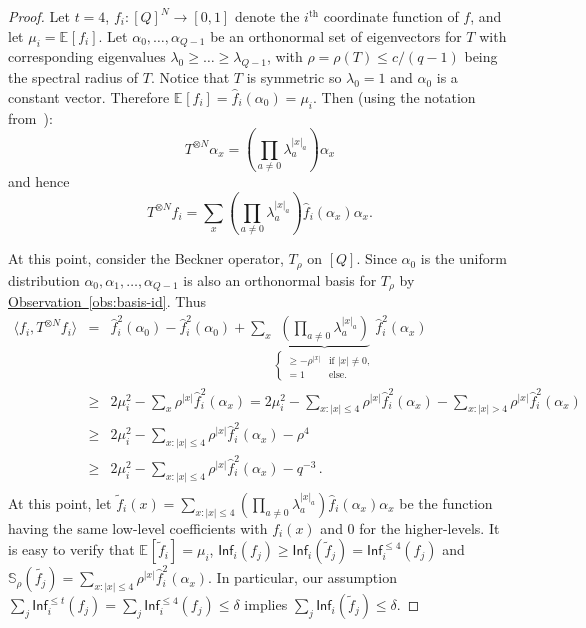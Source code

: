 \documentclass[10pt]{article}
\theoremstyle{definition}
\numberwithin{equation}{section}
\newcommand{\expref}[2]{\texorpdfstring{\hyperref[#2]{#1~\ref{#2}}}{#1~\ref{#2}}}
\newcommand{\expct}[2]{\mathbb{E}_{#1}\left[#2\right]}
\newcommand{\infl}{\ensuremath{\mathsf{Inf}}}
\newcommand{\texsup}[2]{\ensuremath{\text{#1}^{\text{#2}}}}
\renewcommand{\ge}{\geqslant}
\renewcommand{\le}{\leqslant}
\begin{document}
\begin{proof}
  Let $t=4$, $f_i:[Q]^N\rightarrow[0,1]$ denote the \texsup{$i$}{th}
  coordinate function of $f$, and let $\mu_i = \expct{}{f_i}$. Let
  $\alpha_0,\ldots, \alpha_{Q-1}$ be an orthonormal set of
  eigenvectors for $T$ with corresponding eigenvalues ${\lambda_0\ge
    \ldots\ge \lambda_{Q-1}}$, with $\rho=\rho(T)\le {c}/{(q-1)}$
  being the spectral radius of $T$. Notice that $T$ is symmetric so
  $\lambda_0 = 1$ and $\alpha_0$ is a constant vector. Therefore
  $\expct{}{f_i} = \hat{f}_i(\alpha_0) = \mu_i$. Then (using the
  notation from~\cite{DMR}):
  \[ T^{\otimes N} \alpha_x = (\prod_{a \neq 0} \lambda_a ^{|x|_a}) \alpha_x \]
  and hence
  \[ T^{\otimes N} f_i = \sum_x (\prod_{a \neq 0} \lambda_a ^{|x|_a})
  \hat{f}_i(\alpha_x) \alpha_x. \]


  At this point, consider the Beckner operator, $T_{\rho}$ on
  $[Q]$. Since $\alpha_0$ is the uniform distribution 
  $\alpha_0,\alpha_1,\ldots,\alpha_{Q-1}$ is
  also an orthonormal basis for $T_{\rho}$ by \expref{Observation}{obs:basis-id}. 
  Thus
  \begin{eqnarray*}
    \langle f_i, T^{\otimes N} f_i\rangle &=& 
    \hat{f}_i^2(\alpha_0) - \hat{f}_i^2(\alpha_0) + 
    \sum_x \underbrace{(\prod_{a \neq 0} \lambda_a ^{|x|_a})}_
    {
      \begin{cases}
        \ge - \rho^{|x|} & \text{if }|x|\neq 0,  \\
        = 1 & \text{else.}
      \end{cases}
    }
    \hat{f}_i^2(\alpha_x)\\
    &\ge& 2 \mu_i^2 - 
    \sum_{x} \rho^{|x|} \hat{f}_i^2(\alpha_x) =
    2\mu_i^2 -\sum_{x:|x|\le 4} \rho^{|x|} \hat{f}_i^2(\alpha_x) 
    -\sum_{x:|x|> 4} \rho^{|x|} \hat{f}_i^2(\alpha_x)\\
    &\ge& 2\mu_i^2 
    -\sum_{x:|x|\le 4} \rho^{|x|} \hat{f}_i^2(\alpha_x) 
    - \rho^{4}\\
    &\ge&  2\mu_i^2 
    -\sum_{x:|x|\le 4} \rho^{|x|} \hat{f}_i^2(\alpha_x) 
    - q^{-3}\,.\\
  \end{eqnarray*}
  At this point, let $\tilde{f}_i(x) = \sum_{x:|x|\le 4} (\prod_{a
    \neq 0} \lambda_a ^{|x|_a}) \hat{f}_i(\alpha_x)\alpha_x $ be the
  function having the same low-level coefficients with $f_i(x)$ and
  $0$ for the higher-levels. It is easy to verify that
  $\expct{}{\tilde{f}_i} = \mu_i$, $\infl_i(f_j) \ge
  \infl_i(\tilde{f}_j) = \infl_i^{\le 4}(f_j)$ and
  $\mathbb{S}_{\rho}(\tilde{f_j}) = \sum_{x:|x|\le 4} \rho^{|x|}
  \hat{f}_i^2(\alpha_x)$. In particular, our assumption $\sum_j
  \infl_i^{\le t}(f_j)=\sum_j \infl_i^{\le 4}(f_j) \le \delta$ implies
  $\sum_j \infl_i(\tilde{f}_j) \le \delta$.


\end{proof}
\end{document}
